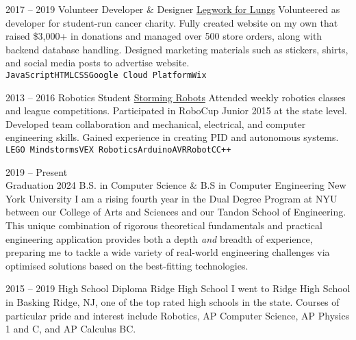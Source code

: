 \documentclass[9pt]{developercv} %
\begin{document}
\begin{entrylist}
	\entry
	{2017 -- 2019}
	{Volunteer Developer \& Designer}
	{\href{http://www.legworkforlungs.org}{Legwork for Lungs}}
	{
		Volunteered as developer for student-run cancer charity.
		Fully created website on my own that raised \$3,000+ in donations and managed over 500 store orders, along with backend database handling.
		Designed marketing materials such as stickers, shirts, and social media posts to advertise website.
		\\
		\texttt{JavaScript}\slashsep\texttt{HTML}\slashsep\texttt{CSS}\slashsep\texttt{Google Cloud Platform}\slashsep\texttt{Wix}
	}

	\entry
	{2013 -- 2016}
	{Robotics Student}
	{\href{https://stormingrobots.com/prod/default.html}{Storming Robots}}
	{
		Attended weekly robotics classes and league competitions.
		Participated in RoboCup Junior 2015 at the state level.
		Developed team collaboration and mechanical, electrical, and computer engineering skills.
		Gained experience in creating PID and autonomous systems.
		\\
		\texttt{LEGO Mindstorms}\slashsep\texttt{VEX Robotics}\slashsep\texttt{Arduino}\slashsep\texttt{AVR}\slashsep\texttt{RobotC}\slashsep\texttt{C++}
	}

\end{entrylist}



\begin{entrylist}
	\entry
	{
		2019 -- Present
		\\
		\footnotesize{Graduation 2024}
	}
	{B.S. in Computer Science \& B.S in Computer Engineering}
	{New York University}
	{
		I am a rising fourth year in the Dual Degree Program at NYU between our College of Arts and Sciences and our Tandon School of Engineering.
		This unique combination of rigorous theoretical fundamentals and practical engineering application provides both a depth \textit{and} breadth of experience, preparing me to tackle a wide variety of real-world engineering challenges via optimised solutions based on the best-fitting technologies.
	}

	\entry
	{2015 -- 2019}
	{High School Diploma}
	{Ridge High School}
	{I went to Ridge High School in Basking Ridge, NJ, one of the top rated high schools in the state. Courses of particular pride and interest include Robotics, AP Computer Science, AP Physics 1 and C, and AP Calculus BC.}
\end{entrylist}
\end{document}

